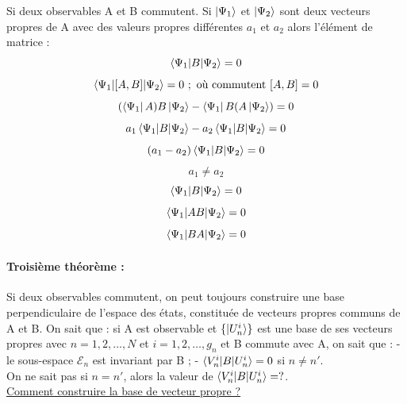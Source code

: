 \documentclass[12pt,a4paper,titlepage]{book}
\begin{document}
Si deux observables A et B commutent. Si $\ket{\Psi_1}$ et $\ket{\Psi_2}$ sont deux vecteurs propres de A avec des valeurs propres différentes $a_1$ et $a_2$ alors l'élément de matrice :
\begin{equation*}
\braket{\Psi_1 | B | \Psi_2} = 0
\end{equation*}
\begin{equation*}
\braket{\Psi_1 | [A,B] | \Psi_2} = 0 ~;~ \text{où commutent}~ [A,B] = 0
\end{equation*}
\begin{equation*}
(\bra{\Psi_1} A) B\ket{\Psi_2} - \bra{\Psi_1} B (A \ket{\Psi_2}) = 0
\end{equation*}
\begin{equation*}
a_1 \braket{\Psi_1 | B | \Psi_2} - a_2 \braket{\Psi_1 | B | \Psi_2} = 0
\end{equation*}
\begin{equation*}
(a_1 - a_2) \braket{\Psi_1 | B | \Psi_2} = 0
\end{equation*}
\begin{equation*}
a_1 \neq a_2
\end{equation*}
\begin{equation*}
\braket{\Psi_1 | B | \Psi_2} = 0
\end{equation*}
\begin{equation*}
\braket{\Psi_1 | AB | \Psi_2} = 0
\end{equation*}
\begin{equation*}
\braket{\Psi_1 | BA | \Psi_2} = 0
\end{equation*}

\paragraph*{Troisième théorème :}

Si deux observables commutent, on peut toujours construire une base perpendiculaire de l'espace des états, constituée de vecteurs propres communs de A et B. On sait que : si A est observable et $\lbrace \ket{U_n^i} \rbrace$ est une base de ses vecteurs propres avec $n = 1, 2, \ldots, N$ et $i = 1, 2, \ldots, g_n$ et B commute avec A, on sait que : - le sous-espace $\mathcal{E}_n$ est invariant par B ; - $\braket{V_n^i | B | U_n^i} = 0$ si $n \neq n'$. \\

On ne sait pas si $n = n'$, alors la valeur de $\braket{V_n^i | B | U_n^i} = ?$.\\

\underline{Comment construire la base de vecteur propre ?}\\
\end{document}

